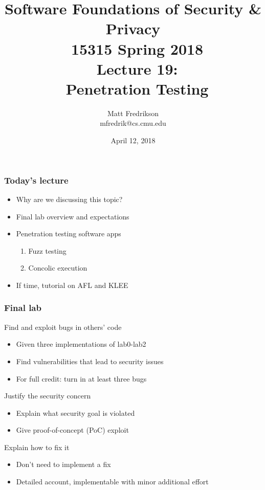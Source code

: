 \documentclass[10pt,xcolor={dvipsnames}]{beamer}
\title[Testing]{
\RaggedRight
  Software Foundations of Security \& Privacy \\
  \ 15315 Spring 2018 \\
  \ Lecture 19: \\
  \ Penetration Testing
}
\author[Matt Fredrikson, Jean Yang]{
  Matt Fredrikson \\
  mfredrik@cs.cmu.edu
}
\date{April 12, 2018}
\begin{document}
\setlength\abovedisplayskip{3pt}
\setlength\belowdisplayskip{3pt}


\begin{frame}
\titlepage
\end{frame}


\begin{frame}

\frametitle{Today's lecture}


\begin{itemize}
\item Why are we discussing this topic? \\[1ex]
\pause\item Final lab overview and expectations \\[1ex]
\pause\item Penetration testing software apps \\[1ex]
\begin{enumerate}
\item Fuzz testing \\[1ex]
\item Concolic execution \\[1ex]
\end{enumerate}
\pause\item If time, tutorial on AFL and KLEE 
\end{itemize}

\end{frame}


\begin{frame}

\frametitle{Final lab}

Find and exploit bugs in others' code
\begin{itemize}
\pause\item Given three implementations of lab0-lab2
\item Find vulnerabilities that lead to security issues
\item For full credit: turn in at least three bugs\\[1em]
\end{itemize}

\pause Justify the security concern
\begin{itemize}
\item Explain what security goal is violated
\item Give proof-of-concept (PoC) exploit\\[1em]
\end{itemize}

\pause Explain how to fix it
\begin{itemize}
\item Don't need to implement a fix
\item Detailed account, implementable with minor additional effort\\[1em]
\end{itemize}

\end{frame}
\end{document}
